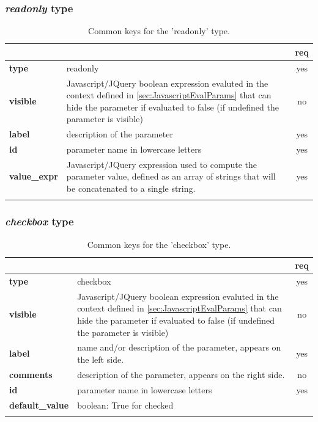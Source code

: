 \subsubsection{ \emph{readonly} type}

\begin{longtable}{|>{\bf}L{\linewidth}|L{\linewidth}|c|}
\hline
      &  & {\bf req} 
\tabularnewline \hline \hline
 type  & readonly    & yes \\ \hline
 visible  & Javascript/JQuery boolean expression evaluted in the context defined 
              in \ref{sec:JavascriptEvalParams} that can hide the parameter if
            evaluated to false (if undefined the parameter is visible)& no \\ \hline
 label & description of the parameter & yes \\ \hline
 id         & parameter name in lowercase letters  & yes \\ \hline
 value\_expr & Javascript/JQuery expression used to compute the parameter value, defined as an
              array of strings that will be concatenated to a single string.
            & yes \\ \hline
\caption{Common keys for the 'readonly' type.}
\end{longtable}

\subsubsection{ \emph{checkbox} type}

\begin{longtable}{|>{\bf}L{\linewidth}|L{\linewidth}|c|}
\hline
      &  & {\bf req} 
\tabularnewline \hline \hline
 type  & checkbox  & yes \\ \hline
 visible  & Javascript/JQuery boolean expression evaluted in the context defined 
              in \ref{sec:JavascriptEvalParams} that can hide the parameter if
            evaluated to false (if undefined the parameter is visible)& no \\ \hline
 label  & name and/or description of the parameter, appears on the left side. & yes
                      \\ \hline
 comments & description of the parameter, appears on the right side. & no
                      \\ \hline
 id         & parameter name in lowercase letters  & yes \\ \hline
 default\_value & boolean: True for checked & \\ \hline
\caption{Common keys for the 'checkbox' type.}
\end{longtable}

